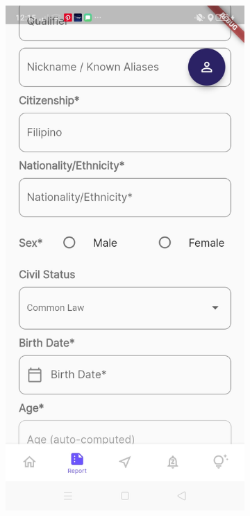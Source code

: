 \begin{figure}[!h]
\begin{subfigure}[c]{0.30\linewidth}
    \end{subfigure}
    \centering
    \begin{subfigure}[c]{0.30\linewidth}
        \centering
        \includegraphics[scale=0.15]{figures/Chapter4/Main/p3-2.jpg}

\end{subfigure}
\end{figure}
